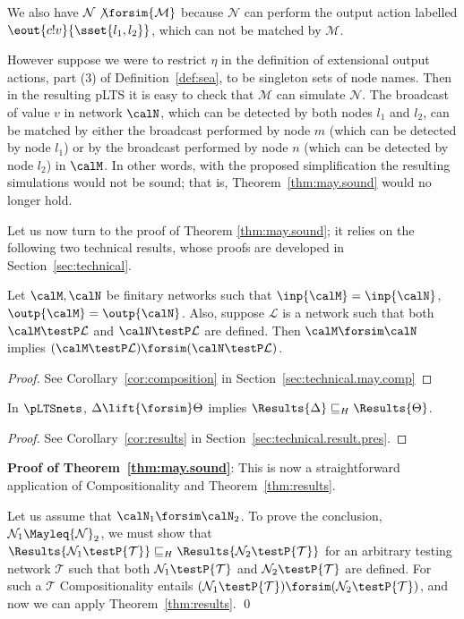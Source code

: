 \documentclass{LMCS}
\newcommand{\calL}{\ensuremath{{\mathcal{L}}}}
\begin{document}
\begin{exa}
We also have ${\mathcal N} \not\forsim {\mathcal M}$ because ${\mathcal N}$ can perform the output action labelled
$\eout{c!v}{\sset{l_1,l_2}}$, which can not be matched by ${\mathcal M}$. 

However suppose we were to restrict $\eta$ in the definition of
extensional output actions, part (3) of Definition~\ref{def:sea}, to be
singleton sets of node names. Then in the resulting pLTS it is easy to
check that ${\mathcal M}$ can simulate ${\mathcal N}$. 
The broadcast of value $v$ in network $\calN$, which can be detected by both 
nodes $l_1$ and $l_2$, can be matched by either the broadcast performed by node $m$ 
(which can be detected by node $l_1$) or by the broadcast 
performed by node $n$ (which can be detected by node $l_2$) in $\calM$.
In other words, with the proposed 
simplification the resulting simulations would not be sound; that
is, Theorem~\ref{thm:may.sound} would no longer hold.
\end{exa}


Let us now turn to the proof of Theorem \ref{thm:may.sound};
it relies on the following two technical results, whose proofs are developed
in Section~\ref{sec:technical}. 
\begin{thm}[Compositionality]\label{thm:composition}
Let $\calM, \calN$ be finitary networks such that $
\inp{\calM} = \inp{\calN}$, $\outp{\calM} = \outp{\calN}$. 
Also, suppose $\calL$ is a network such that both 
$\calM \testP \calL$ and $\calN \testP \calL$ are defined. 
Then $\calM \forsim  \calN$ implies  
$(\calM \testP \calL)  \forsim (\calN \testP \calL)$.
\end{thm}
\begin{proof}
  See Corollary~\ref{cor:composition} in Section~\ref{sec:technical.may.comp}
\end{proof}

\begin{thm}\label{thm:results}
  In $\pLTSnets$, $\Delta \lift{\forsim} \Theta$ implies
  $\Results{\Delta} \sqsubseteq_{H} \Results{\Theta}$.
\end{thm}
\begin{proof}
  See  Corollary~\ref{cor:results} in Section~\ref{sec:technical.result.pres}. 
\end{proof}

\textbf{Proof of Theorem~\ref{thm:may.sound}}: 
This is now a straightforward application of  Compositionality and Theorem~\ref{thm:results}. 

Let us assume that $\calN_1 \forsim \calN_2$.
To prove the conclusion,  ${\mathcal N}_1 \Mayleq  {\mathcal N}_2$, we must show that 
$\Results{{\mathcal N}_1 \testP {\mathcal T}} \sqsubseteq_{H}  
\Results{{\mathcal N}_2 \testP {\mathcal T}}$
for an arbitrary testing network ${\mathcal T}$ 
such that both  ${\mathcal N}_1 \testP {\mathcal T}$ and ${\mathcal N}_2 \testP {\mathcal T}$ are defined. 
For such a ${\mathcal T}$ Compositionality entails  
$({\mathcal N}_1 \testP {\mathcal T}) \forsim ({\mathcal N}_2 \testP {\mathcal T})$, and now we can apply 
Theorem~\ref{thm:results}. \qed
\end{document}
